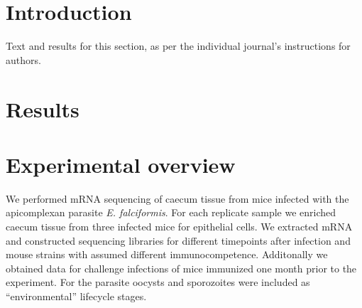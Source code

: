 \documentclass{bmcart}
\begin{document}



\section*{Introduction}
Text and results for this section, as per the individual journal's instructions for authors. 


  \section*{Results}


  \section*{Experimental overview}
We performed mRNA sequencing of caecum tissue from mice infected with
the apicomplexan parasite \textit{E. falciformis}. For each replicate
sample we enriched caecum tissue from three infected mice for
epithelial cells. We extracted mRNA and constructed sequencing
libraries for different timepoints after infection and mouse strains
with assumed different immunocompetence.
Additonally we obtained data for challenge infections of mice
immunized one month prior to the experiment. For the parasite oocysts
and sporozoites were included as ``environmental'' lifecycle stages.
\end{document}

